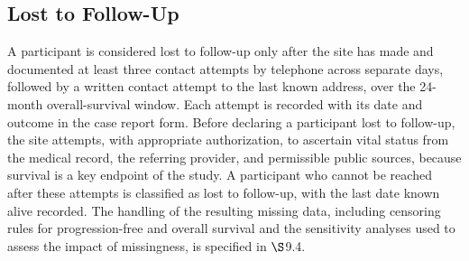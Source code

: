 \subsection{Lost to Follow-Up}

A participant is considered lost to follow-up only after the site has made and
documented at least three contact attempts by telephone across separate days,
followed by a written contact attempt to the last known address, over the 24-month
overall-survival window. Each attempt is recorded with its date and outcome in the
case report form. Before declaring a participant lost to follow-up, the site
attempts, with appropriate authorization, to ascertain vital status from the medical
record, the referring provider, and permissible public sources, because survival is
a key endpoint of the study. A participant who cannot be reached after these
attempts is classified as lost to follow-up, with the last date known alive
recorded. The handling of the resulting missing data, including censoring rules for
progression-free and overall survival and the sensitivity analyses used to assess
the impact of missingness, is specified in $\S$9.4.

